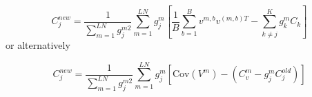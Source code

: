 \documentclass{paper}
\begin{document}
\begin{equation}
C_j^{new} = \frac{1}{\sum_{m=1}^{LN} g_j^{m2}} \sum_{m=1}^{LN} g_j^m \left[ \frac{1}{B} \sum_{b=1}^B v^{m,b} v^{(m,b)T} - \sum_{k \neq j}^K g_k^m C_k \right]
\end{equation}
%
or alternatively

\begin{equation}
C_j^{new} = \frac{1}{\sum_{m=1}^{LN} g_j^{m2}} \sum_{m=1}^{LN} g_j^m \left[ \textrm{Cov} (V^{m}) - (C_v^m - g_j^m C_j^{old}) \right]
\end{equation}
\end{document}
